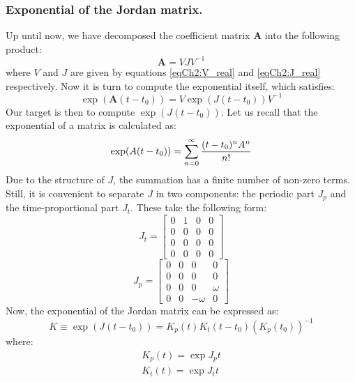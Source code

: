		\subsubsection{Exponential of the Jordan matrix.}
		\indent Up until now, we have decomposed the coefficient matrix $\bm A$ into the following product:
		\[
		\bm A = V J V^{-1}
		\]
		\noindent where $V$ and $J$ are given by equations \eqref{eqCh2:V_real} and \eqref{eqCh2:J_real} respectively. Now it is turn to compute the exponential itself, which satisfies:
		\begin{equation}
		\exp\left(\bm A (t - t_0) \right) = V \exp\left(J(t - t_0)\right) V^{-1}
		\label{eqCh2:expAt}
		\end{equation}
		\indent Our target is then to compute $\exp\left(J(t - t_0)\right)$. Let us recall that the exponential of a matrix is calculated as:
		\[
		\exp(A(t - t_0)) = \displaystyle\sum_{n = 0}^{\infty} \dfrac{(t - t_0)^n A^n}{n!}
		\]
		\indent Due to the structure of $J$, the summation has a finite number of non-zero terms. Still, it is convenient to separate $J$ in two components: the periodic part $J_p$ and the time-proportional part $J_t$. These take the following form:
		\begin{equation}
		J_t = \left[ \begin{array}{cccc}
			0 	& 1	& 0		& 0			\\
			0 	& 0	& 0  	& 0 		\\
			0 	& 0	& 0		& 0	\\
			0 	& 0	& 0 	& 0
			\end{array}\right]
			\label{eqCh2:Jt}
		\end{equation}
		\begin{equation}
		J_p = \left[ \begin{array}{cccc}
			0 	& 0	& 0		& 0			\\
			0 	& 0	& 0  	& 0 		\\
			0 	& 0	& 0		& \omega	\\
			0 	& 0	& -\omega 	& 0
			\end{array}\right]
			\label{eqCh2:Jp}
		\end{equation}
		\indent Now, the exponential of the Jordan matrix can be expressed as:
		\begin{equation}
		K \equiv \exp \left(J(t - t_0)\right) = K_p(t) K_t(t - t_0) \left(K_p(t_0)\right)^{-1}
		\label{eqCh2:K_decomp}
		\end{equation}
		\noindent where:
		\begin{subequations}
		\begin{alignat}{4}
		K_p(t) = \exp J_p t\\
		K_t(t) = \exp J_t t
		\end{alignat}
		\end{subequations}
